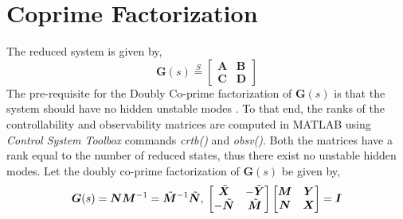 \section{Coprime Factorization}
The reduced system is given by,
$$\bm{G}(s) \overset{\mathrm{\textit{S}}}{=} 
\begin{bmatrix}
    \bm{A} & \bm{B}\\
    \bm{C}& \bm{D}
\end{bmatrix}$$
The pre-requisite for the Doubly Co-prime factorization of $\mathbf{G}(s)$ is that the system should have no hidden unstable modes \cite{Bru87}. To that end, the ranks of the controllability and observability matrices are computed in MATLAB using \emph{Control System Toolbox} commands \emph{crtb()} and \emph{obsv()}. Both the matrices have a rank equal to the number of reduced states, thus there exist no unstable hidden modes. 
Let the doubly co-prime factorization of $\mathbf{G}(s)$ be given by,
\begin{equation}
    \bm{G}(s) = \bm{N}\bm{M}^{-1} = \Tilde{\bm{M}}^{-1}\Tilde{\bm{N}}, \:
    \begin{bmatrix}
        \Tilde{\bm{X}} & -\Tilde{\bm{Y}}\\
        -\Tilde{\bm{N}} & \Tilde{\bm{M}}
    \end{bmatrix}
    \begin{bmatrix}
        \bm{M}&\bm{Y}\\
        \bm{N}&\bm{X}
    \end{bmatrix} = \bm{I}
    \label{eq:doubly}
\end{equation}

